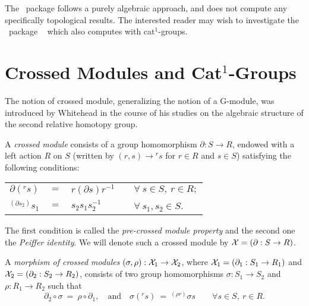 \documentclass[a4paper,11pt]{article}
\theoremstyle{plain}
\theoremstyle{definition}
\begin{document}
The \XMod\ package follows a purely algebraic approach, 
and does not compute any specifically topological results. 
The interested reader may wish to investigate the \GAP\ package
\HAP\ \cite{hap} which also computes with cat$^1$-groups. 



\section{Crossed Modules and Cat$^{1}$-Groups}

The notion of crossed module, generalizing the notion of a G-module, 
was introduced by Whitehead \cite{whitehead-II} in the course of his studies 
on the algebraic structure of the second relative homotopy group.

A \emph{crossed module} consists of a group homomorphism 
$\partial : S \rightarrow R$, endowed with a left action $R$ on $S$ 
(written by $(r,s) \rightarrow {}^{r}s$ for $r \in R$ and $s \in S$) 
satisfying the following conditions:

\begin{center}
	\begin{tabular}{rclll}
	$\partial (^{r}s)$ 
		& $=$ 
			& $r(\partial s)r^{-1}$ 
				&   & $\forall~ s \in S,~ r \in R; $ \\
	$^{(\partial s_{2})}s_{1}$ 
		& $=$ 
			& $s_{2}s_{1}s_{2}^{-1}$ 
				&   & $\forall~ s_{1},s_{2} \in S$. 
	\end{tabular}
\end{center}

The first condition is called the \emph{pre-crossed module property} 
and the second one the \emph{Peiffer identity}. 
We will denote such a crossed module by $\mathcal{X} = (\partial : S \rightarrow R)$.

A \emph{morphism of crossed modules} 
$(\sigma ,\rho ) : \mathcal{X}_{1} \rightarrow \mathcal{X}_{2}$, 
where $\mathcal{X}_{1} = (\partial_{1} : S_{1} \rightarrow R_{1})$ 
and   $\mathcal{X}_{2} = (\partial_{2} : S_{2} \rightarrow R_{2})$, 
consists of two group homomorphisms $\sigma : S_{1} \rightarrow S_{2}$
and $\rho : R_{1} \rightarrow R_{2}$ such that 
\[ 
\partial_{2}\circ\sigma ~=~ \rho\circ\partial_{1}, 
\quad \mbox{and} \quad 
\sigma(^{r}s) ~=~ ^{(\rho r)}\sigma s 
\qquad
\forall s \in S,~ r \in R.
\] 
\end{document}
